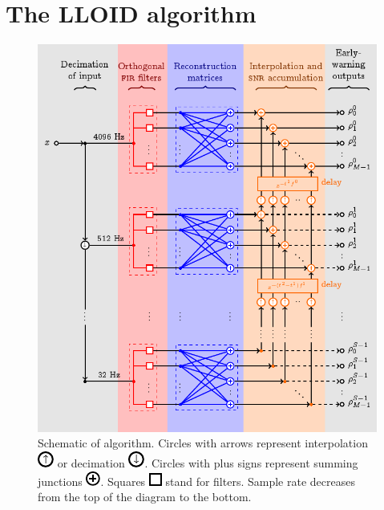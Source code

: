 \documentclass[portrait,plainboxedsections]{sciposter}
\begin{document}
\begin{minipage}[t]{0.4\textwidth}

\section*{The LLOID algorithm}

\begin{figure}[h!]
	\begin{center}
		\includegraphics[width=\textwidth]{figures/lloid-diagram}
		\caption{\label{fig:pipeline} Schematic of \lloid{} algorithm.
		Circles with arrows represent interpolation
\protect\includegraphics[scale=3]{figures/upsample-symbol} or decimation
\protect\includegraphics[scale=3]{figures/downsample-symbol}.  Circles with plus
signs represent summing junctions
\protect\includegraphics[scale=3]{figures/adder-symbol}.  Squares
\protect\includegraphics[scale=3]{figures/fir-symbol} stand for \fir{} filters.  Sample
rate decreases from the top of the diagram to the bottom.}
	\end{center}
\end{figure}


\end{minipage}
\end{document}
